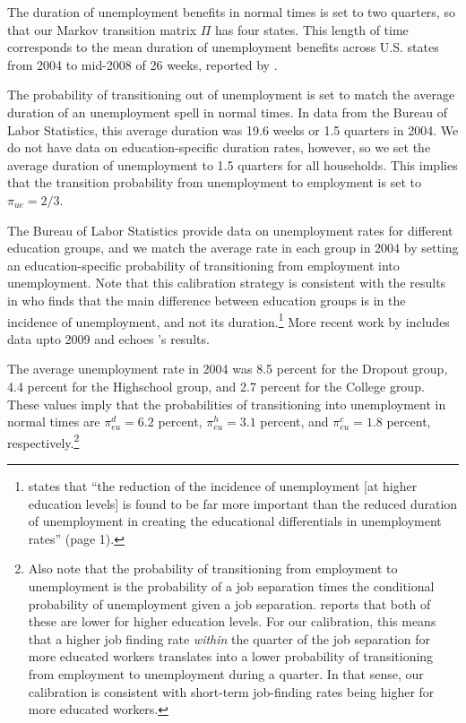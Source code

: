 \documentclass[\econtexRoot/HAFiscal]{subfiles}
\begin{document}
The duration of unemployment benefits in normal times is set to two quarters, so that our Markov transition matrix $\Pi$ has four states.
This length of time corresponds to the mean duration of unemployment benefits across U.S.
states from 2004 to mid-2008 of 26 weeks, reported by \cite{rothstein2017scraping}.


The probability of transitioning out of unemployment is set to match the average duration of an unemployment spell in normal times.
In data from the Bureau of Labor Statistics, this average duration was 19.6 weeks or 1.5 quarters in 2004.
We do not have data on  education-specific duration rates, however, so we set the average duration of unemployment to 1.5 quarters for all households.
This implies that the transition probability from unemployment to employment is set to $\pi_{ue}=2/3$.


The Bureau of Labor Statistics provide data on unemployment rates for different education groups, and we match the average rate in each group in 2004 by setting an education-specific probability of transitioning from employment into unemployment.
Note that this calibration strategy is consistent with the results in \citet{mincer1991education} who finds that the main difference between education groups is in the incidence of unemployment, and not its duration.\footnote{\citet{mincer1991education} states that ``the reduction of the incidence of unemployment [at higher education levels] is found to be far more important than the reduced duration of unemployment in creating the educational differentials in unemployment rates'' (page 1).} More recent work by \citet{elsby2010labor} includes data upto 2009 and echoes \citeauthor{mincer1991education}'s results.


The average unemployment rate in 2004 was 8.5 percent for the Dropout group, 4.4 percent for the Highschool group, and 2.7 percent for the College group.
These values imply that the probabilities of transitioning into unemployment in normal times are $\pi_{eu}^d=6.2$ percent, $\pi_{eu}^h=3.1$ percent, and $\pi_{eu}^c=1.8$ percent, respectively.\footnote{Also note that the probability of transitioning from employment to unemployment is the probability of a job separation times the conditional probability of unemployment given a job separation.
\citet{mincer1991education} reports that both of these are lower for higher education levels.
For our calibration, this means that a higher job finding rate \textit{within} the quarter of the job separation for more educated workers translates	into a lower probability of transitioning from employment to unemployment during a quarter.
In that sense, our calibration is consistent with short-term job-finding rates being higher for more educated workers.}
\end{document}
